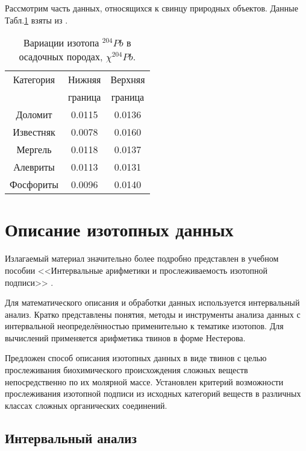 \documentclass[a5paper,openany]{book}
\begin{document}
Рассмотрим часть данных, относящихся к свинцу природных объектов. Данные Табл.\ref{t:204LeadVariation} взяты из \cite{IUPACLead}.
\begin{table}[h!]
	\begin{center}
		{\small
			\begin{tabular}{ccc}
				\hline
				Категория & Нижняя & Верхняя \\
				~ & граница & граница \\ 
				\hline
				Доломит	& 0.0115 & 0.0136 \\
				Известняк	& 0.0078 & 0.0160 \\
				Мергель 	& 0.0118 & 0.0137 \\
				Алевриты 	& 0.0113 & 0.0131 \\
				Фосфориты & 0.0096 & 0.0140 \\
				\hline
			\end{tabular}
		}
		\caption{Вариации изотопа $^{204}Pb$ в осадочных породах,  $ \chi ^{204}Pb$.}
		\label{t:204LeadVariation}
	\end{center}
\end{table}

	
	
	
	\chapter{Описание изотопных данных} \label{DataInte}

Излагаемый материал значительно более подробно представлен в учебном пособии <<Интервальные  арифметики и прослеживаемость изотопной подписи>> \cite{InteIsotopes2023}.	


Для математического описания и обработки данных используется интервальный анализ. 		
Кратко представлены понятия, методы и инструменты анализа данных с интервальной неопределённостью применительно к тематике изотопов. Для вычислений применяется арифметика твинов в форме Нестерова.


Предложен способ описания изотопных данных в виде твинов с целью прослеживания биохимического происхождения сложных веществ непосредственно по их молярной массе. Установлен критерий возможности прослеживания изотопной подписи из исходных категорий веществ в различных классах сложных органических соединений.	

  \section{Интервальный анализ}\label{InteAnalysis}
\end{document}
